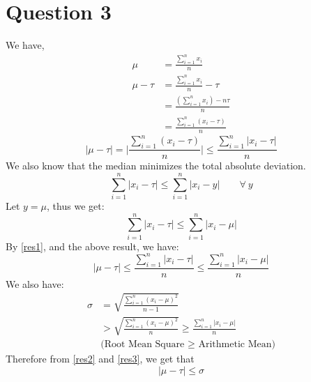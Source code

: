\documentclass[11pt]{article}
\begin{document}
\newpage
\section*{Question 3}
We have,
\begin{equation*}
    \begin{split}
        \mu &= \frac{\sum_{i=1}^n x_i}{n} \\
        \mu - \tau &= \frac{\sum_{i=1}^n x_i}{n} - \tau \\
            &= \frac{(\sum_{i=1}^nx_i) - n\tau}{n} \\
            &= \frac{\sum_{i=1}^n (x_i - \tau)}{n}
    \end{split}
\end{equation*} 
\begin{equation}
    \label{res1}
    |\mu - \tau| = \Bigg|\frac{\sum_{i=1}^n (x_i - \tau)}{n}\Bigg| \le \frac{\sum_{i=1}^n |x_i - \tau|}{n}
\end{equation}
We also know that the median minimizes the total absolute deviation.
\begin{equation*}
    \sum_{i=1}^n |x_i - \tau| \le \sum_{i=1}^n |x_i - y| \hspace{2em} \forall \ y 
\end{equation*}
Let $y = \mu$, thus we get:
\begin{equation*}
    \sum_{i=1}^n |x_i - \tau| \le \sum_{i=1}^n |x_i - \mu|
\end{equation*}     
By \eqref{res1}, and the above result, we have:
\begin{equation}
    \label{res2}
    |\mu - \tau| \le \frac{\sum_{i=1}^n |x_i - \tau|}{n} \le \frac{\sum_{i=1}^n |x_i - \mu|}{n}
\end{equation}
We also have:
\begin{equation}
    \label{res3}
    \begin{split}
        \sigma &= \sqrt{\frac{\sum_{i=1}^n (x_i - \mu)^2}{n-1}} \\
            &> \sqrt{\frac{\sum_{i=1}^n (x_i - \mu)^2}{n}} \ge \frac{\sum_{i=1}^n |x_i - \mu|}{n} \hspace{2em} \\
            &\text{(Root Mean Square $\ge$ Arithmetic Mean)}
    \end{split}
\end{equation}
Therefore from \eqref{res2} and \eqref{res3}, we get that
\begin{equation*}
    |\mu - \tau| \le \sigma
\end{equation*}
\end{document}
